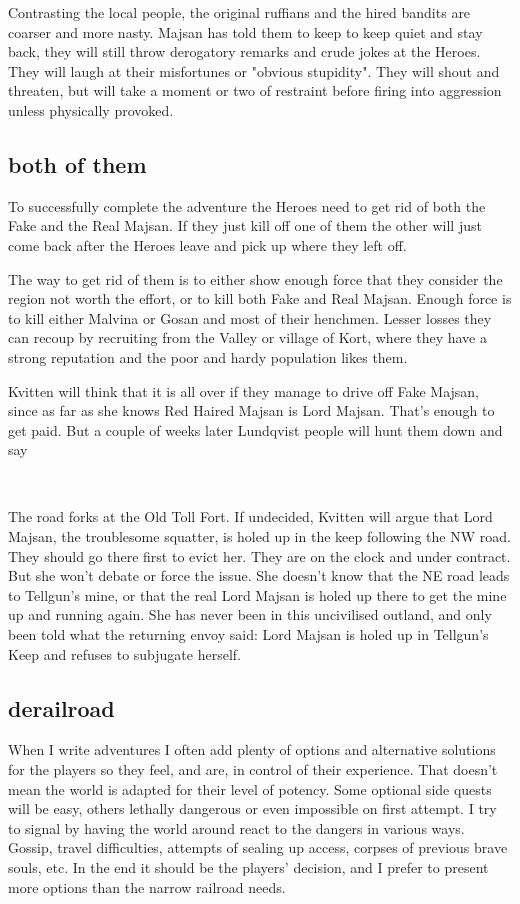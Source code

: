 Contrasting the local people, the original ruffians and the hired bandits are coarser and more nasty. Majsan has told them to keep to keep quiet and stay back, they will still throw derogatory remarks and crude jokes at the Heroes. They will laugh at their misfortunes or "obvious stupidity". They will shout and threaten, but will take a moment or two of restraint before firing into aggression unless physically provoked.


\subsection*{both of them}
To successfully complete the adventure the Heroes need to get rid of both the Fake and the Real Majsan. If they just kill off one of them the other will just come back after the Heroes leave and pick up where they left off.

The way to get rid of them is to either show enough force that they consider the region not worth the effort, or to kill both Fake and Real Majsan. Enough force is to kill either Malvina or Gosan and most of their henchmen. Lesser losses they can recoup by recruiting from the Valley or village of Kort, where they have a strong reputation and the poor and hardy population likes them.

Kvitten will think that it is all over if they manage to drive off Fake Majsan, since as far as she knows Red Haired Majsan is Lord Majsan. That's enough to get paid. But a couple of weeks later Lundqvist people will hunt them down and say

\

The road forks at the Old Toll Fort. If undecided, Kvitten will argue that Lord Majsan, the troublesome squatter, is holed up in the keep following the NW road. They should go there first to evict her. They are on the clock and under contract. But she won't debate or force the issue. She doesn't know that the NE road leads to Tellgun's mine, or that the real Lord Majsan is holed up there to get the mine up and running again. She has never been in this uncivilised outland, and only been told what the returning envoy said: Lord Majsan is holed up in Tellgun's Keep and refuses to subjugate herself.


\subsection*{derailroad}
When I write adventures I often add plenty of options and alternative solutions for the players so they feel, and are, in control of their experience. That doesn't mean the world is adapted for their level of potency. Some optional side quests will be easy, others lethally dangerous or even impossible on first attempt. I try to signal by having the world around react to the dangers in various ways. Gossip, travel difficulties, attempts of sealing up access, corpses of previous brave souls, etc. In the end it should be the players' decision, and I prefer to present more options than the narrow railroad needs.

